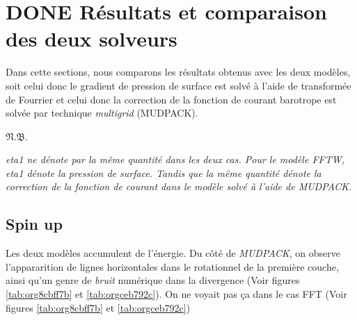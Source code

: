 \documentclass[10pt]{article}
\numberwithin{equation}{section}
\newcommand{\pt}{\hspace{1pt}} %
\newcommand{\nb}{\underline{{\footnotesize\EightStarConvex}\pt $\mathfrak{N.B.}$\vphantom{p}}\hspace{3pt}}
\begin{document}
\section{{\bfseries\sffamily DONE} Résultats et comparaison des deux solveurs}
\label{sec:orgc945162}
Dans cette sections, nous comparons les résultats obtenus avec les deux modèles, soit celui donc le gradient de pression de surface est solvé à l'aide de transformée de Fourrier et celui donc la correction de la fonction de courant barotrope est solvée par technique \emph{multigrid} (MUDPACK).\bigskip

\nb\begin{minipage}[t]{0.9\linewidth}
\itshape 
eta1 ne dénote par la même quantité dans les deux cas.
Pour le modèle FFTW, eta1 dénote la pression de surface.
Tandis que la même quantité dénote la correction de la fonction de courant dans le modèle solvé à l'aide de MUDPACK.   
\end{minipage}
\newpage

\subsection{Spin up}
\label{sec:orgb47cc0a}
Les deux modèles accumulent de l'énergie.
Du côté de \emph{MUDPACK}, on observe l'appararition de lignes horizontales dans le rotationnel de la première couche, ainsi qu'un genre de \emph{bruit} numérique dans la divergence (Voir figures \ref{tab:org8cbff7b} et \ref{tab:orgceb792c}).
On ne voyait pas ça dans le cas FFT (Voir figures \ref{tab:org8cbff7b} et \ref{tab:orgceb792c})
\end{document}
